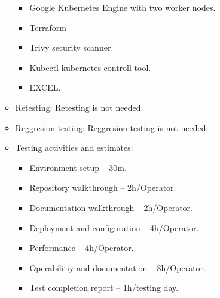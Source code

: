 \begin{itemize}
\begin{itemize}
\begin{itemize}
                        \item Google Kubernetes Engine with two worker nodes.
                        \item Terraform
                        \item Trivy security scanner.
                        \item Kubectl kubernetes controll tool.
                        \item EXCEL.
                    \end{itemize}
              \item Retesting: Retesting is not needed.
              \item Reggresion testing: Reggresion testing is not needed.
              \item Testing activities and estimates:
                    \begin{itemize}
                        \item Environment setup – 30m.
                        \item Repository walkthrough – 2h/Operator.
                        \item Documentation walkthrough – 2h/Operator.
                        \item Deployment and configuration – 4h/Operator.
                        \item Performance – 4h/Operator.
                        \item Operabilitiy and documentation – 8h/Operator.
                        \item Test completion report – 1h/testing day.
                    \end{itemize}


\end{itemize}
\end{itemize}
